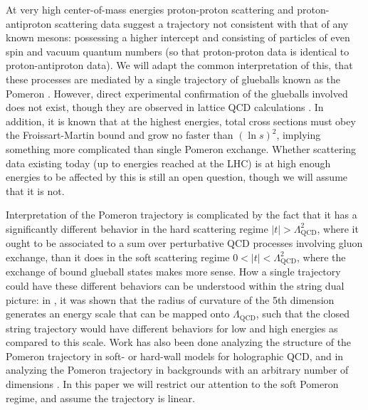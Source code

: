 \documentclass[aps, prd, preprintnumbers, floatfix, showpacs, showkeys, nofootinbib, 10pt]{revtex4-1}
\begin{document}
At very high center-of-mass energies proton-proton scattering and proton-antiproton scattering data suggest a trajectory not consistent with that of any known mesons: possessing a higher intercept and consisting of particles of even spin and vacuum quantum numbers (so that proton-proton data is identical to proton-antiproton data).  We will adapt the common interpretation of this, that these processes are mediated by a single trajectory of glueballs known as the Pomeron \cite{CGM}.  However, direct experimental confirmation of the glueballs involved does not exist, though they are observed in lattice QCD calculations \cite{lattice}.  In addition, it is known that at the highest energies, total cross sections must obey the Froissart-Martin bound and grow no faster than $(\ln s)^2$, implying something more complicated than single Pomeron exchange.  Whether scattering data existing today (up to energies reached at the LHC) is at high enough energies to be affected by this is still an open question, though we will assume that it is not.

Interpretation of the Pomeron trajectory is complicated by the fact that it has a significantly different behavior in the hard scattering regime $|t| > \Lambda^2_{\mathrm{QCD}}$, where it ought to be associated to a sum over perturbative QCD processes involving gluon exchange, than it does in the soft scattering regime $0 < |t| < \Lambda^2_{\mathrm{QCD}}$, where the exchange of bound glueball states makes more sense.  How a single trajectory could have these different behaviors can be understood within the string dual picture: in \cite{bpstetc}, it was shown that the radius of curvature of the 5th dimension generates an energy scale that can be mapped onto $\Lambda_{\mathrm{QCD}}$, such that the closed string trajectory would have different behaviors for low and high energies as compared to this scale.  Work has also been done analyzing the structure of the Pomeron trajectory in soft- or hard-wall models for holographic QCD, and in analyzing the Pomeron trajectory in backgrounds with an arbitrary number of dimensions \cite{topdown}.  In this paper we will restrict our attention to the soft Pomeron regime, and assume the trajectory is linear.
\end{document}

